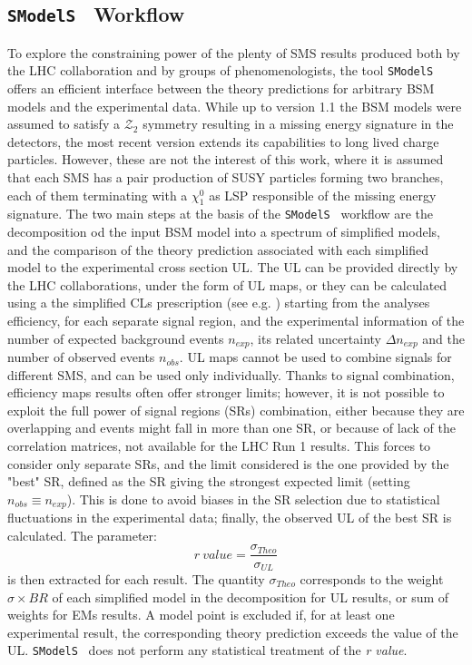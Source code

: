 \documentclass[a4paper,11pt]{article}
\newcommand{\SMO}{\texttt{SModelS\xspace}}
\newcommand{\RVALUE}{\textit{r value}}
\begin{document}
\subsection{\SMO~ Workflow}
To explore the constraining power of the plenty of SMS results produced both by the LHC collaboration and by groups of phenomenologists, the tool \SMO\cite{Kraml:2013mwa,Ambrogi:2017neo,Ambrogi:2018ujg} offers an efficient interface between the theory predictions for arbitrary BSM models and the experimental data. While up to version 1.1 the BSM models were assumed to satisfy a $\mathcal{Z_2}$ symmetry resulting in a missing energy signature in the detectors, the most recent version extends its capabilities to long lived charge particles. However, these are not the interest of this work, where it is assumed that each SMS has a pair production of SUSY particles forming two branches, each of them terminating with a $\chi_1 ^0$ as LSP responsible of the missing energy signature.
%
The two main steps at the basis of the \SMO~ workflow are the decomposition od the input BSM model into a spectrum of simplified models, and the comparison of the theory prediction associated with each simplified model to the experimental cross section UL. The UL can be provided directly by the LHC collaborations, under the form of UL maps, or they can be calculated using a the simplified CLs prescription (see e.g. \cite{Read:2002hq,Junk:1999kv}) starting from the analyses efficiency, for each separate signal region, and the experimental information of the number of expected background events $n_{exp}$, its related uncertainty $\Delta n_{exp}$ and the number of observed events $n_{obs}$. UL maps cannot be used to combine signals for different SMS, and can be used only individually. Thanks to signal combination, efficiency maps results often offer stronger limits; however, it is not possible to exploit the full power of signal regions (SRs) combination, either because they are overlapping and events might fall in more than one SR, or because of lack of the correlation matrices, not available for the LHC Run 1 results. This forces to consider only separate SRs, and the limit considered is the one provided by the "best" SR, defined as the SR giving the strongest expected limit (setting $n_{obs}\equiv n_{exp}$). This is done to avoid biases in the SR selection due to statistical fluctuations in the experimental data; finally, the observed UL of the best SR is calculated. The parameter:
\begin{equation}\label{rvalue}
r \ value = \frac{\sigma_{Theo}}{\sigma_{UL}}
\end{equation}
is then extracted for each result. 
The quantity $\sigma_{Theo}$ corresponds to the weight $\sigma \times BR$ of each simplified model in the decomposition for UL results, or sum of weights for EMs results. A model point is excluded if, for at least one experimental result, the corresponding theory prediction exceeds the value of the UL. \SMO~ does not perform any statistical treatment of the \RVALUE.
%
\end{document}
